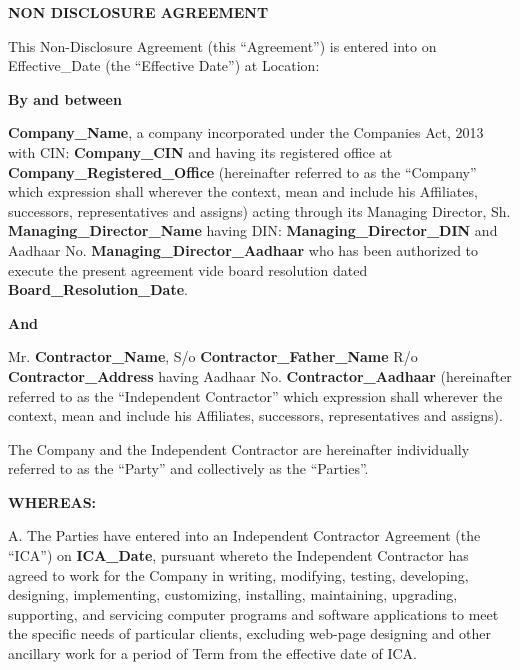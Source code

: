 \documentclass[12pt]{article}
\begin{document}
\begin{center}
    {\Large\bfseries NON DISCLOSURE AGREEMENT}
\end{center}

\vspace{1em}
\noindent
This Non-Disclosure Agreement (this ``Agreement'') is entered into on {{Effective_Date}} (the ``Effective Date'') at {{Location}}:

\vspace{1em}
\noindent\textbf{By and between}

\vspace{0.5em}
\noindent
\textbf{{{Company_Name}}}, a company incorporated under the Companies Act, 2013 with CIN: \textbf{{{Company_CIN}}} and having its registered office at \textbf{{{Company_Registered_Office}}} (hereinafter referred to as the ``Company'' which expression shall wherever the context, mean and include his Affiliates, successors, representatives and assigns) acting through its Managing Director, Sh. \textbf{{{Managing_Director_Name}}} having DIN: \textbf{{{Managing_Director_DIN}}} and Aadhaar No. \textbf{{{Managing_Director_Aadhaar}}} who has been authorized to execute the present agreement vide board resolution dated \textbf{{{Board_Resolution_Date}}}.

\vspace{1em}
\noindent\textbf{And}

\vspace{0.5em}
\noindent
Mr. \textbf{{{Contractor_Name}}}, S/o \textbf{{{Contractor_Father_Name}}} R/o \textbf{{{Contractor_Address}}} having Aadhaar No. \textbf{{{Contractor_Aadhaar}}} (hereinafter referred to as the ``Independent Contractor'' which expression shall wherever the context, mean and include his Affiliates, successors, representatives and assigns).

\vspace{1em}
\noindent
The Company and the Independent Contractor are hereinafter individually referred to as the ``Party'' and collectively as the ``Parties''.

\vspace{1.5em}
\noindent\textbf{WHEREAS:}

\vspace{0.5em}
\noindent
A. The Parties have entered into an Independent Contractor Agreement (the ``ICA'') on \textbf{{{ICA_Date}}}, pursuant whereto the Independent Contractor has agreed to work for the Company in writing, modifying, testing, developing, designing, implementing, customizing, installing, maintaining, upgrading, supporting, and servicing computer programs and software applications to meet the specific needs of particular clients, excluding web-page designing and other ancillary work for a period of {{Term}} from the effective date of ICA.
\end{document}
